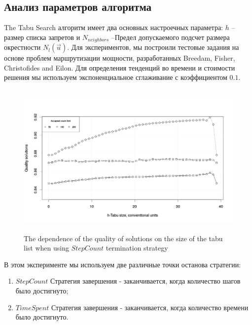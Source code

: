 \documentclass[]{TAACpaper}
\begin{document}
\subsection{Анализ параметров алгоритма}
The Tabu Search алгоритм имеет два основных настроечных параметра: $h$ -- размер списка запретов и $N_{neighbors}$ --Предел допускаемого подсчет размера окрестности $N_l(\vec{u})$. Для экспериментов, мы построили тестовые задания на основе проблем маршрутизации мощности, разработанных Breedam, Fisher, Christofides and Eilon. Для определения тенденций во времени и стоимости решения мы используем экспоненциальное сглаживание с коэффициентом $0.1$.

\begin{figure}[h]
	\hfil\includegraphics[height=3.0in]{images/tabuSize_stepCount}\hfil
	\caption
	{
	  The dependence of the quality of solutions on the size of the tabu list when using $ StepCount $ termination strategy
	}
	\label{aba:fig2}
\end{figure}

В этом эксперименте мы используем две различные точки останова стратегии:
\begin{enumerate}
	\item $StepCount$ Стратегия завершения - заканчивается, когда количество шагов было достигнуто;
	\item $TimeSpent$ Стратегия завершения - заканчивается, когда количество времени было достигнуто.
\end{enumerate}
\end{document}

